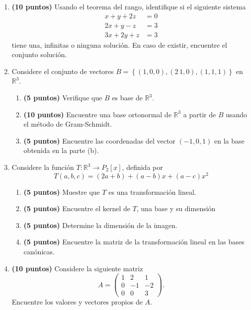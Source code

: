 \documentclass[a4paper]{article}
\theoremstyle{exampstyle}
\theoremstyle{definition}
\begin{document}
\begin{enumerate}
\item \textbf{(10 puntos)} Usando el teorema del rango, identifique si el siguiente sistema 
    \begin{align*}
x + y +2z &= 0 \\
2x +y -  z &= 3\\
3x +2y +  z &= 3
\end{align*}
tiene una, infinitas o ninguna soluci\'on. En caso de existir, encuentre el conjunto soluci\'on.

\item Considere el conjunto de vectores $B = \left\{ ( 1 , 0 , 0) , ( 2 \, 1 , 0 ) , (1 , 1 , 1 ) \right\}$ en $\mathbb R^{3}$. 
\begin{enumerate}
    \item \textbf{(5 puntos)} Verifique que $B$ es base de $\mathbb R^{3}$. 
    \item \textbf{(10 puntos)} Encuentre una base ortonormal de $\mathbb R^{3}$ a partir de $B$ usando el método de Gram-Schmidt.
    \item \textbf{(5 puntos)} Encuentre las coordenadas del vector $  (-1, 0 , 1 ) $ en la base obtenida en la parte (b). 
\end{enumerate}


\item Considere la funci\'on 
      $T:\mathbb{R}^3\to P_2[x]$, definida por $$T(a,b,c)=(2a+b)+(a-b)x+ (a-c)x^2$$
      \begin{enumerate}
          \item \textbf{(5 puntos)} Muestre que $T$ es una transformaci\'on lineal. 
          \item \textbf{(5 puntos)} Encuentre el kernel de $T$, una base y su dimensi\'on \item \textbf{(5 puntos)} Determine la dimensi\'on de la imagen.
          \item \textbf{(5 puntos)} Encuentre la matriz de la transformaci\'on lineal en las bases can\'onicas.
      \end{enumerate}
    \item \textbf{(10 puntos)} Considere la siguiente matriz
\[    A=\begin{pmatrix} 1 &2 & 1 \\ 0 & -1 & -2 \\ 0 & 0 & 3 \end{pmatrix}.\]
Encuentre los valores y vectores propios de $A$.
    

\newpage
        

\end{enumerate}
\end{document}
